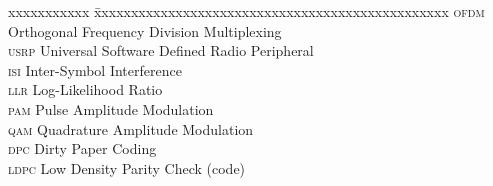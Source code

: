 \abbreviations

\noindent
\begin{tabbing}
	xxxxxxxxxxx \= xxxxxxxxxxxxxxxxxxxxxxxxxxxxxxxxxxxxxxxxxxxxxxxx \kill
	\textsc{ofdm} \> Orthogonal Frequency Division Multiplexing \\
	\textsc{usrp} \> Universal Software Defined Radio Peripheral \\
	\textsc{isi}  \> Inter-Symbol Interference \\
	\textsc{llr}  \> Log-Likelihood Ratio \\
	\textsc{pam}  \> Pulse Amplitude Modulation \\
	\textsc{qam}  \> Quadrature Amplitude Modulation \\
	\textsc{dpc}  \> Dirty Paper Coding \\
	\textsc{ldpc} \> Low Density Parity Check (code) \\
\end{tabbing}
